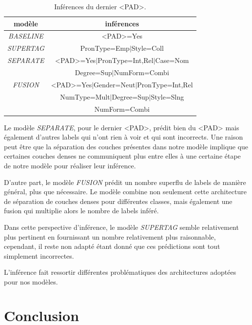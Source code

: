 \documentclass[a4paper]{article}
\begin{document}
\begin{table}[H]
    \centering
    \begin{tabular}{|c|c|}
        \hline
        \textbf{modèle} & \textbf{inférences} \\
        \hline
        \textit{BASELINE} & <PAD>=Yes \\
        \hline
        \textit{SUPERTAG} & PronType=Emp$\mid$Style=Coll\\
        \hline
        \textit{SEPARATE} & <PAD>=Yes$\mid$PronType=Int,Rel$\mid$Case=Nom\\
            & Degree=Sup$\mid$NumForm=Combi\\
        \hline
        \textit{FUSION} & <PAD>=Yes$\mid$Gender=Neut$\mid$PronType=Int,Rel\\
            & NumType=Mult$\mid$Degree=Sup$\mid$Style=Slng\\
            & NumForm=Combi\\
        \hline
    \end{tabular}
    \caption{Inférences du dernier <PAD>.}
    \label{tab: lastpad}
\end{table} 

Le modèle \textit{SEPARATE}, pour le dernier <PAD>, prédit bien du <PAD> mais également d'autres 
labels qui n'ont rien à voir et qui sont incorrects. Une raison peut être que la séparation des couches présentes dans notre modèle 
implique que certaines couches denses ne communiquent plus entre elles à une certaine étape de notre modèle pour réaliser leur 
inférence.

D'autre part, le modèle \textit{FUSION} prédit un nombre superflu de labels de manière général, plus que nécessaire. Le modèle 
combine non seulement cette architecture de séparation de couches denses pour différentes classes, mais également une fusion qui multiplie alors le nombre de labels inféré. 

Dans cette perspective d'inférence, le modèle \textit{SUPERTAG} semble relativement plus pertinent en fournissant un nombre 
relativement plus raisonnable, cependant, il reste non adapté étant donné que ces prédictions sont tout simplement incorrectes. 

L'inférence fait ressortir différentes problématiques des architectures adoptées pour nos modèles.

\section{Conclusion}
\end{document}
